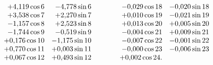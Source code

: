 \begin{landscape}
\[\begin{array}{@{}r@{\quad}r@{\qquad\qquad}r@{\quad}r@{}}
+4{,}119\cos 6&-4{,}778\sin 6&-0{,}029\cos 18&-0{,}020\sin 18\\
+3{,}538\cos 7&+2{,}270\sin 7&+0{,}010\cos 19&-0{,}021\sin 19\\
-1{,}157\cos 8&+2{,}523\sin 8&+0{,}013\cos 20&+0{,}005\sin 20\\
-1{,}744\cos 9&-0{,}519\sin 9&-0{,}004\cos 21&+0{,}009\sin 21\\
+0{,}176\cos 10&-1{,}175\sin 10&-0{,}007\cos 22&-0{,}001\sin 22\\
+0{,}770\cos 11&+0{,}003\sin 11&-0{,}000\cos 23&-0{,}006\sin 23\\
+0{,}067\cos 12&+0{,}493\sin 12&+0{,}002\cos 24.&
\end{array}
\]
\clearpage
\endgroup
\end{landscape}
